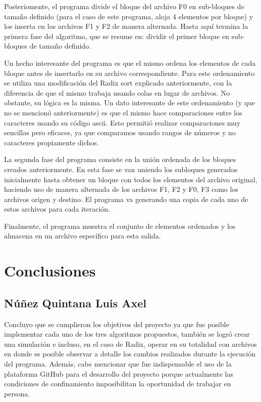 \documentclass[12pt, letterpaper]{report}
\begin{document}
    Posteriomente, el programa divide el bloque del archivo F0 en sub-bloques de tamaño definido (para el caso de este programa, aloja 4 elementos por bloque) y los inserta en los archivos F1 y F2 de manera alternada. Hasta aquí termina la primera fase del algoritmo, que se resume en: dividir el primer bloque en sub-bloques de tamaño definido.
    
    Un hecho interesante del programa es que el mismo ordena los elementos de cada bloque antes de insertarlo en su archivo correspondiente. Para este ordenamiento se utiliza una modificación del Radix sort explicado anteriormente, con la diferencia de que el mismo trabaja usando colas en lugar de archivos. No obstante, su lógica es la misma. Un dato interesante de este ordenamiento (y que no se mencionó anteriormente) es que el mismo hace comparaciones entre los caracteres usando su código ascii. Esto permitió realizar comparaciones muy sencillas pero eficaces, ya que comparamos usando rangos de números y no caracteres propiamente dichos.
    
    La segunda fase del programa consiste en la unión ordenada de los bloques creados anteriormente. En esta fase se van uniendo los subloques generados inicialmente hasta obtener un bloque con todos los elementos del archivo original, haciendo uso de manera alternada de los archivos F1, F2 y F0, F3 como los archivos origen y destino. El programa va generando una copia de cada uno de estos archivos para cada iteración.
    
    Finalmente, el programa muestra el conjunto de elementos ordenados y los almacena en un archivo específico para esta salida.
    

\newpage
\section*{Conclusiones}
    
    \subsection*{Núñez Quintana Luis Axel}
    Concluyo que se cumplieron los objetivos del proyecto ya que fue posible implementar cada uno de los tres algoritmos propuestos, también se logró crear una simulación e incluso, en el caso de Radix, operar en su totalidad con archivos en donde es posible observar a detalle los cambios realizados durante la ejecución del programa. Además, cabe mencionar que fue indispensable el uso de la plataforma GitHub para el desarrollo del proyecto porque actualmente las condiciones de confinamiento imposibilitan la oportunidad de trabajar en persona.
    
\end{document}
